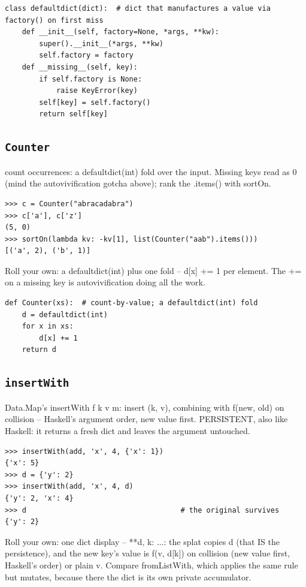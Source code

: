 \documentclass[10pt,letterpaper]{book}
\begin{document}
\begin{lstlisting}[style=ex]
class defaultdict(dict):  # dict that manufactures a value via factory() on first miss
    def __init__(self, factory=None, *args, **kw):
        super().__init__(*args, **kw)
        self.factory = factory
    def __missing__(self, key):
        if self.factory is None:
            raise KeyError(key)
        self[key] = self.factory()
        return self[key]
\end{lstlisting}

\subsection{\texttt{Counter}}\label{def:Counter}
count occurrences: a defaultdict(int) fold over the input. Missing keys read as 0 (mind the autovivification gotcha above); rank the .items() with sortOn.
\begin{lstlisting}[style=ex]
>>> c = Counter("abracadabra")
>>> c['a'], c['z']
(5, 0)
>>> sortOn(lambda kv: -kv[1], list(Counter("aab").items()))
[('a', 2), ('b', 1)]
\end{lstlisting}

Roll your own: a defaultdict(int) plus one fold -- d[x] += 1 per element. The += on a missing key is autovivification doing all the work.

\begin{lstlisting}[style=ex]
def Counter(xs):  # count-by-value; a defaultdict(int) fold
    d = defaultdict(int)
    for x in xs:
        d[x] += 1
    return d
\end{lstlisting}
\subsection{\texttt{insertWith}}\label{def:insertWith}
Data.Map's insertWith f k v m: insert (k, v), combining with f(new, old) on collision -- Haskell's argument order, new value first. PERSISTENT, also like Haskell: it returns a fresh dict and leaves the argument untouched.
\begin{lstlisting}[style=ex]
>>> insertWith(add, 'x', 4, {'x': 1})
{'x': 5}
>>> d = {'y': 2}
>>> insertWith(add, 'x', 4, d)
{'y': 2, 'x': 4}
>>> d                                    # the original survives
{'y': 2}
\end{lstlisting}

Roll your own: one dict display -- {**d, k: ...}: the splat copies d (that IS the persistence), and the new key's value is f(v, d[k]) on collision (new value first, Haskell's order) or plain v. Compare fromListWith, which applies the same rule but mutates, because there the dict is its own private accumulator.
\end{document}
